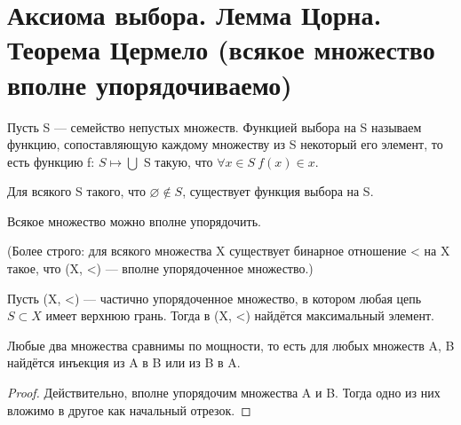 \section{Аксиома выбора. Лемма Цорна. Теорема Цермело (всякое множество вполне упорядочиваемо)}
\begin{definition}
	Пусть S — семейство непустых множеств. Функцией выбора на S называем функцию, сопоставляющую каждому множеству
	из S некоторый его элемент, то есть функцию f: $S \mapsto \bigcup$ S такую, что $\forall x \in S \ f(x) \in x$.
\end{definition}

\begin{theorem}  
	Для всякого S такого, что $ \varnothing \notin S$, существует функция выбора на S.
\end{theorem}

\begin{theorem} 
	Всякое множество можно вполне упорядочить.

	(Более строго: для всякого множества X существует бинарное отношение < на X такое, что (X, <) — вполне
	упорядоченное множество.)
\end{theorem}

\begin{lemma} 
	Пусть (X, <) — частично упорядоченное множество, в котором любая цепь $S \subset X$ имеет верхнюю грань. Тогда
	в (X, <) найдётся максимальный элемент.
\end{lemma}

\begin{theorem}
	Любые два множества сравнимы по мощности, то есть для любых множеств A, B найдётся инъекция из A в B или из B в A.
\end{theorem}

\begin{proof}
	Действительно, вполне упорядочим множества A и B. Тогда одно из них вложимо в другое как начальный отрезок.
\end{proof}
